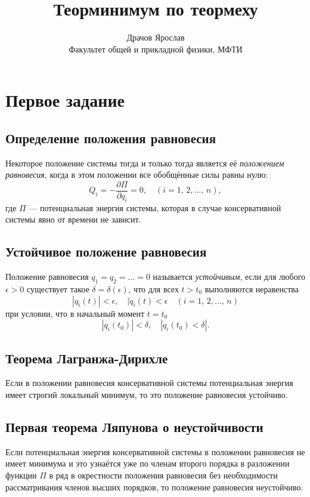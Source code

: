 \documentclass[a4paper,12pt]{article}
\title{Теорминимум
по теормеху}
\author{Драчов Ярослав\\ Факультет общей и прикладной физики, МФТИ}
\begin{document}
%
\maketitle
\section*{Первое задание}
\subsection{Определение положения равновесия}
\begin{dfn}
	Некоторое положение системы тогда и только тогда является её
	\emph{положением
	равновесия}, когда в этом положении все обобщённые силы равны нулю:
	\[
		Q_i=-\frac{\partial \Pi}{\partial q_i} =0, \quad (i=1,\,2,\ldots
		,\,n),
	\] 
	где $\Pi$ --- потенциальная энергия системы, которая в случае
	консервативной системы явно от времени не зависит.
\end{dfn}
\subsection{Устойчивое положение равновесия}
\begin{dfn}
	Положение равновесия $q_1=q_2=\ldots=0$ называется  \emph{устойчивым},
	если для любого $\epsilon >0$ существует такое $\delta=\delta(\epsilon)$,
	что для всех $t>t_0$ выполняются неравенства
	\[
		|q_i(t)|<\epsilon,\quad |\dot{q}_i(t)<\epsilon \quad(i=1,\,2,\ldots
		,\,n)
	\] 
	при условии, что в начальный момент $t=t_0$ 
	\[
		|q_i(t_0)|<\delta,\quad |\dot{q}_i(t_0)<\delta|
	.\] 
\end{dfn}
\subsection{Теорема Лагранжа-Дирихле}
\begin{thm}
	Если в положении равновесия консервативной системы потенциальная 
	энергия имеет строгий  локальный минимум,  то это положение равновесия
	устойчиво.
\end{thm}
\subsection{Первая теорема Ляпунова о неустойчивости}
\begin{thm}[Ляпунова, 1-я]
Если потенцмальная энергия консервативной системы в положении равновесия не
имеет минимума и это узнаётся уже по членам второго порядка в разложении
функции $\Pi$ в ряд в окрестности положения равновесия без необходимости
рассматривания членов высших порядков, то положение равновесия неустойчиво.
\end{thm}
\end{document}
